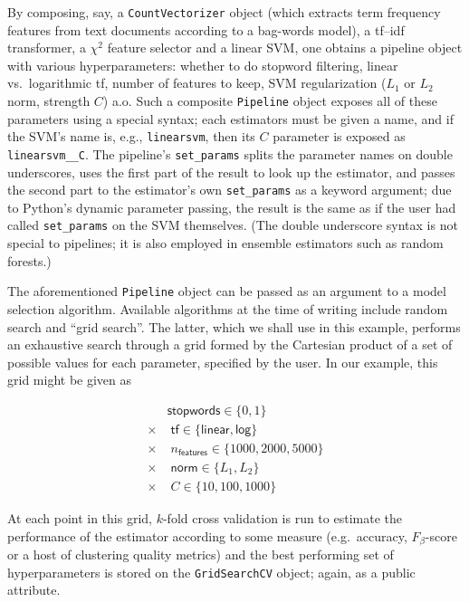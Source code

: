 \documentclass[a4paper,twocolumn]{article}
\begin{document}
By composing, say, a \texttt{CountVectorizer} object
(which extracts term frequency features from text documents
according to a bag-words model),
a \textsf{tf--idf} transformer, a $\chi^2$ feature selector and a linear SVM,
one obtains a pipeline object with various hyperparameters:
whether to do stopword filtering,
linear vs.\ logarithmic \textsf{tf}, number of features to keep,
SVM regularization ($L_1$ or $L_2$ norm, strength $C$) a.o.
Such a composite \texttt{Pipeline} object
exposes all of these parameters using a special syntax;
each estimators must be given a name,
and if the SVM's name is, e.g., \texttt{linearsvm},
then its $C$ parameter is exposed as \texttt{linearsvm\_\_C}.
The pipeline's \texttt{set\_params} splits the parameter names
on double underscores, uses the first part of the result
to look up the estimator,
and passes the second part to the estimator's own \texttt{set\_params}
as a keyword argument; due to Python's dynamic parameter passing,
the result is the same as if the user had called \texttt{set\_params}
on the SVM themselves.
(The double underscore syntax is not special to pipelines;
it is also employed in ensemble estimators such as random forests.)

The aforementioned \texttt{Pipeline} object
can be passed as an argument to a model selection algorithm.
Available algorithms at the time of writing include random search
\citep{bergstra2012} and ``grid search''.
The latter, which we shall use in this example,
performs an exhaustive search through a grid formed by the Cartesian product
of a set of possible values for each parameter, specified by the user.
In our example, this grid might be given as

\begin{align*}
         & \textsf{stopwords} \in \{0, 1\}                      \\
  \times & \; \textsf{tf} \in \{\textsf{linear}, \textsf{log}\} \\
  \times & \; n_\textsf{features} \in \{1000, 2000, 5000\}      \\
  \times & \; \textsf{norm} \in \{L_1, L_2\}                    \\
  \times & \; C \in \{10, 100, 1000\}
\end{align*}

At each point in this grid, $k$-fold cross validation is run
to estimate the performance of the estimator according to some measure
(e.g.\ accuracy, $F_\beta$-score or a host of clustering quality metrics)
and the best performing set of hyperparameters is stored
on the \texttt{GridSearchCV} object; again, as a public attribute.
\end{document}
